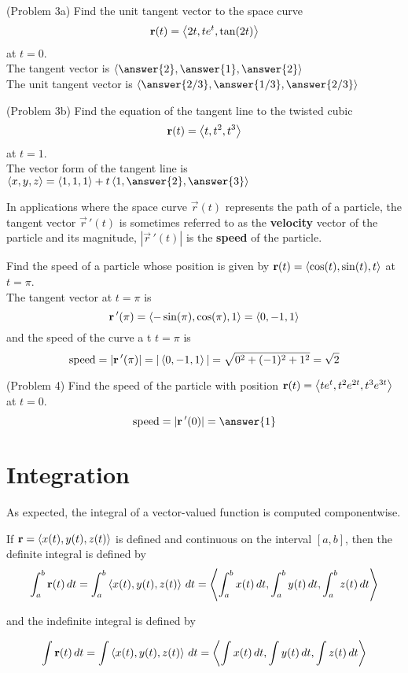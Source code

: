 \documentclass[handout]{ximera}
\begin{document}
\begin{problem}(Problem 3a)
Find the unit tangent vector to the space curve
\[
\mathbf r(t) = \left\langle 2t, te^t, \tan(2t)\right\rangle
\]
at $t = 0$.\\
The tangent vector is $\vector{\answer{2}, \answer{1}, \answer{2}}$\\
The unit tangent vector is $\vector{\answer{2/3}, \answer{1/3}, \answer{2/3}}$
\end{problem}

\begin{problem}(Problem 3b)
Find the equation of the tangent line to the twisted cubic
\[
\mathbf r(t) = \left\langle t, t^2, t^3\right\rangle
\]
at $t = 1$.\\
The vector form of the tangent line is $\vector{x, y, z} = \vector{1,1,1} + t\vector{1, \answer{2}, \answer{3}}$\\
\end{problem}

In applications where the space curve $\vec r(t)$ represents the path of a particle, the tangent vector $\vec r\,'(t)$ is sometimes referred to as the \textbf{velocity} vector
of the particle and its magnitude, $|\vec r\,'(t)|$ is the \textbf{speed} of the particle.

\begin{example}[Example 4]
Find the speed of a particle whose position is given by $\mathbf r(t) = \left\langle \cos(t), \sin(t), t\right\rangle$ at $t = \pi$.\\
The tangent vector at $ t = \pi$ is
\[
\mathbf r\,'(\pi) = \left\langle -\sin(\pi), \cos(\pi), 1\right\rangle = \left\langle 0, -1, 1\right\rangle
\]
and the speed of the curve a t $t = \pi$ is
\[
\text{speed} = |\mathbf r\,'(\pi)| =|\left\langle 0, -1, 1\right\rangle| = \sqrt{0^2 + (-1)^2 + 1^2} = \sqrt 2
\]
\end{example}

\begin{problem}(Problem 4) 
Find the speed of the particle with position $\mathbf r(t) = \left\langle te^t, t^2e^{2t}, t^3e^{3t}\right\rangle$ at $t = 0$.\\
\[
\text{speed} = |\vec r\,'(0)| = \answer{1}
\]
\end{problem}

\section{Integration}

As expected, the integral of a vector-valued function is computed componentwise.

\begin{definition}
If $\mathbf r = \left\langle x(t), y(t), z(t)\right\rangle$ is defined and continuous on the interval $[a, b]$, then the definite integral is defined by
\[
\int_a^b \mathbf r(t) \, dt = \int_a^b \left\langle x(t), y(t), z(t)\right\rangle \, dt =  \left\langle \int_a^b x(t) \, dt,\int_a^b  y(t) \, dt,\int_a^b  z(t) \, dt\right\rangle
\]

and the indefinite integral is defined by

\[
\int \mathbf r(t) \, dt = \int\left\langle x(t), y(t), z(t)\right\rangle \, dt =  \left\langle \int x(t) \, dt,\int  y(t) \, dt,\int  z(t) \, dt\right\rangle
\]
\end{definition}
\end{document}
